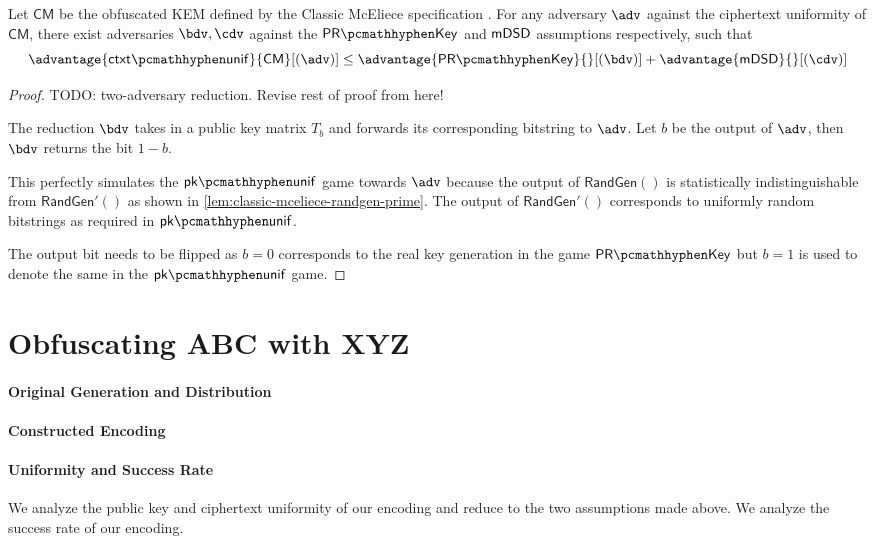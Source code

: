 \begin{lemma} \label{lem:classic-mceliece-ctxt-unif}
    Let $\textsf{CM}$ be the obfuscated KEM defined by the Classic McEliece specification \cite{NISTPQC-R4:ClassicMcEliece22}.
    For any adversary $\adv$ against the ciphertext uniformity of $\textsf{CM}$, there exist adversaries $\bdv, \cdv$ against the $\prkey$ and $\mathsf{mDSD}$ assumptions respectively, such that
    \[ \advantage{\ctxtunif}{\textsf{CM}}[(\adv)] \leq \advantage{\prkey}{}[(\bdv)] + \advantage{\mdsd}{}[(\cdv)] \]
\end{lemma}
\begin{proof}
    TODO: two-adversary reduction. Revise rest of proof from here!
    
    The reduction $\bdv$ takes in a public key matrix $T_b$ and forwards its corresponding bitstring to $\adv$. Let $b$ be the output of $\adv$, then $\bdv$ returns the bit $1-b$.

    This perfectly simulates the $\pkunif$ game towards $\adv$ because the output of $\textsf{RandGen}()$ is statistically indistinguishable from $\textsf{RandGen}'()$ as shown in \cref{lem:classic-mceliece-randgen-prime}. The output of $\textsf{RandGen}'()$ corresponds to uniformly random bitstrings as required in $\pkunif$.

    The output bit needs to be flipped as $b=0$ corresponds to the real key generation in the game $\prkey$ but $b=1$ is used to denote the same in the $\pkunif$ game.
\end{proof}

\section{Obfuscating ABC with XYZ} \label{sec:tbd}
\paragraph{Original Generation and Distribution}
\paragraph{Constructed Encoding}
\paragraph{Uniformity and Success Rate}

We analyze the public key and ciphertext uniformity of our encoding and reduce to the two assumptions made above. We analyze the success rate of our encoding.

